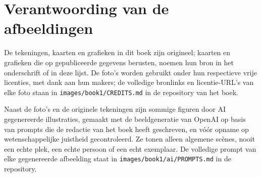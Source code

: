 \chapter*{Verantwoording van de afbeeldingen}

De tekeningen, kaarten en grafieken in dit boek zijn origineel; kaarten en
grafieken die op gepubliceerde gegevens berusten, noemen hun bron in het
onderschrift of in deze lijst. De foto's worden gebruikt onder hun
respectieve vrije licenties, met dank aan hun makers; de volledige
bronlinks en licentie-URL's van elke foto staan in
\texttt{images/book1/CREDITS.md} in de repository van het boek.

\bigskip
Naast de foto's en de originele tekeningen zijn sommige figuren door AI
gegenereerde illustraties, gemaakt met de beeldgeneratie van OpenAI op
basis van prompts die de redactie van het boek heeft geschreven, en vóór
opname op wetenschappelijke juistheid gecontroleerd. Ze tonen alleen
algemene scènes, nooit een echte plek, een echte persoon of een echt
exemplaar. De volledige prompt van elke gegenereerde afbeelding staat in
\texttt{images/book1/ai/PROMPTS.md} in de repository.

